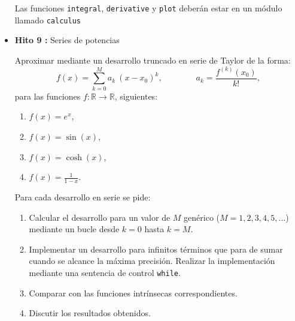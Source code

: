 \documentclass[12pt,spanish]{article}
\begin{document}
\begin{itemize}

Las funciones \texttt{integral}, \texttt{derivative} y \texttt{plot} deberán 
estar en un módulo llamado \texttt{calculus}      


\newpage 
\item {\bf Hito 9 :}  Series de potencias  

Aproximar  mediante un desarrollo truncado en serie de Taylor de la forma:
\[  f(x) = \sum_{k=0} ^M a_k \  (x-x_0)^k, \qquad \qquad a_k = \frac{  f^{(k)} 
(x_0)  }{ k! },  \]  
para las funciones $f : \mathbb{R} \rightarrow \mathbb{R}$, siguientes:    
\begin{enumerate}
	\item $f(x) = e^x$,     
	\item $f(x) = \sin(x)$,   
	\item $f(x) = \cosh(x)$, 
	\item $f(x) = \displaystyle \frac{1}{1 - x}$.               
\end{enumerate}
Para cada desarrollo en serie se pide:    



\begin{enumerate}
	\item Calcular el desarrollo para un valor de $M$ genérico ($M=1, 2, 3, 4, 5, \hdots$) mediante un bucle desde $ k=0$ 
	hasta $ k = M $. 
	\item Implementar un desarrollo para infinitos términos que para de sumar cuando se alcance la máxima precisión. 
	Realizar la implementación mediante 
	una sentencia de control  \verb|while|.   
	\item Comparar con las funciones intrínsecas correspondientes.     
	\item Discutir los resultados obtenidos.
\end{enumerate}




\end{itemize}
\end{document}

